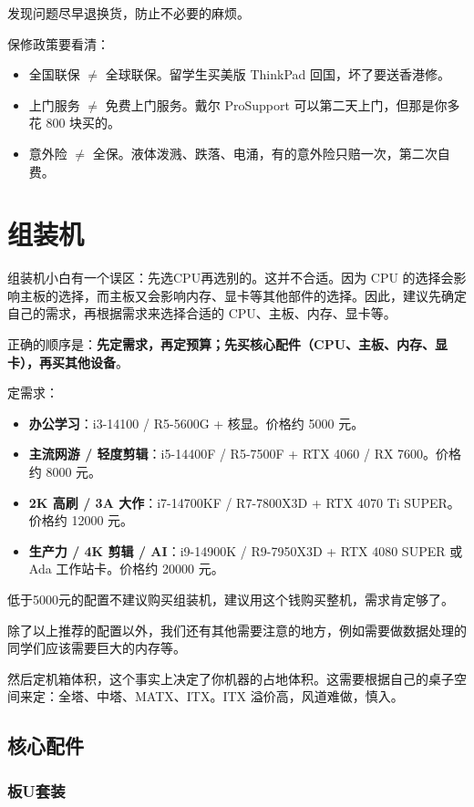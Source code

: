 \documentclass[../main.tex]{subfiles}
\begin{document}
发现问题尽早退换货，防止不必要的麻烦。

保修政策要看清：
\begin{itemize}
  \item 全国联保 $\neq$ 全球联保。留学生买美版 ThinkPad 回国，坏了要送香港修。
  \item 上门服务 $\neq$ 免费上门服务。戴尔 ProSupport 可以第二天上门，但那是你多花 800 块买的。
  \item 意外险 $\neq$ 全保。液体泼溅、跌落、电涌，有的意外险只赔一次，第二次自费。
\end{itemize}

\section{组装机}

组装机小白有一个误区：先选CPU再选别的。这并不合适。因为 CPU 的选择会影响主板的选择，而主板又会影响内存、显卡等其他部件的选择。因此，建议先确定自己的需求，再根据需求来选择合适的 CPU、主板、内存、显卡等。

正确的顺序是：\textbf{先定需求，再定预算；先买核心配件（CPU、主板、内存、显卡），再买其他设备}。

定需求：
\begin{itemize}
  \item \textbf{办公学习}：i3-14100 / R5-5600G + 核显。价格约 5000 元。
  \item \textbf{主流网游 / 轻度剪辑}：i5-14400F / R5-7500F + RTX 4060 / RX 7600。价格约 8000 元。
  \item \textbf{2K 高刷 / 3A 大作}：i7-14700KF / R7-7800X3D + RTX 4070 Ti SUPER。价格约 12000 元。
  \item \textbf{生产力 / 4K 剪辑 / AI}：i9-14900K / R9-7950X3D + RTX 4080 SUPER 或 Ada 工作站卡。价格约 20000 元。
\end{itemize}

低于5000元的配置不建议购买组装机，建议用这个钱购买整机，需求肯定够了。

除了以上推荐的配置以外，我们还有其他需要注意的地方，例如需要做数据处理的同学们应该需要巨大的内存等。

然后定机箱体积，这个事实上决定了你机器的占地体积。这需要根据自己的桌子空间来定：全塔、中塔、MATX、ITX。ITX 溢价高，风道难做，慎入。

\subsection{核心配件}

\subsubsection{板U套装}
\end{document}
